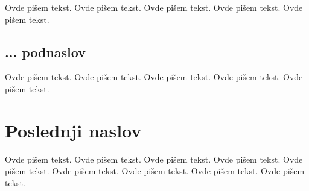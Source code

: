 Ovde pišem tekst.
Ovde pišem tekst.
Ovde pišem tekst.
Ovde pišem tekst.
Ovde pišem tekst.

\subsection{... podnaslov}
\label{subsec:podnaslovM}

Ovde pišem tekst.
Ovde pišem tekst.
Ovde pišem tekst.
Ovde pišem tekst.
Ovde pišem tekst.

\section{Poslednji naslov}
\label{sec:naslovM}

Ovde pišem tekst.
Ovde pišem tekst.
Ovde pišem tekst.
Ovde pišem tekst.
Ovde pišem tekst.
Ovde pišem tekst.
Ovde pišem tekst.
Ovde pišem tekst.
Ovde pišem tekst.

